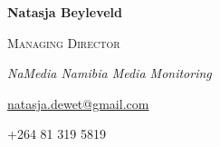 \documentclass[
  letterpaper,
  DIV=11,
  numbers=noendperiod]{scrartcl}
\begin{document}
\begin{large}
  \begin{multicols}{2}
    \begin{flushleft}\textbf{Natasja Beyleveld}\end{flushleft}
  \end{multicols}
  \vspace{-0.17cm}
  \begin{multicols}{2}
    \begin{flushleft}\textsc{Managing Director}\end{flushleft}
  \end{multicols}
  \vspace{-0.17cm}
  \begin{multicols}{2}
    \begin{flushleft}\textit{NaMedia Namibia Media Monitoring}\end{flushleft}
  \end{multicols}
  \vspace{-0.17cm}
  \begin{multicols}{2}
    \begin{flushleft}\href{mailto:natasja.dewet@gmail.com}{natasja.dewet@gmail.com}\end{flushleft}
  \end{multicols}
  \vspace{-0.17cm}
  \begin{multicols}{2}
    \begin{flushleft}{+264 81 319 5819}\end{flushleft}
  \end{multicols}
\end{large}

\vspace{5pt}
\end{document}
